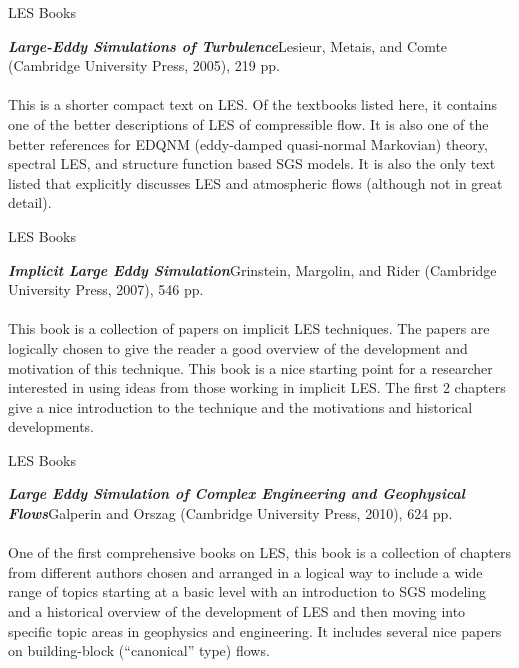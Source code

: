 \begin{frame}{LES Books}

\emph{\textbf{Large-Eddy Simulations of Turbulence}}\newline Lesieur, Metais, and Comte (Cambridge University Press, 2005), 219 pp.
~\\~\\
This is a shorter compact text on LES. Of the textbooks listed here, it contains one of the better descriptions of LES of compressible flow. It is also one of the better references for EDQNM (eddy-damped quasi-normal Markovian) theory, spectral LES, and structure function based SGS models. It is also the only text listed that explicitly discusses LES and atmospheric flows (although not in great detail).
\end{frame}

\begin{frame}{LES Books}

\emph{\textbf{Implicit Large Eddy Simulation}}\newline Grinstein,  Margolin, and Rider (Cambridge University Press, 2007), 546 pp.
~\\~\\
This book is a collection of papers on implicit LES techniques. The papers are logically chosen to give the reader a good overview of the development and motivation of this technique. This book is a nice starting point for a researcher interested in using ideas from those working in implicit LES. The first 2 chapters give a nice introduction to the technique and the motivations and historical developments.
\end{frame}

\begin{frame}{LES Books}

\emph{\textbf{Large Eddy Simulation of Complex Engineering and Geophysical Flows}}\newline Galperin and Orszag (Cambridge University Press, 2010), 624 pp.
~\\~\\
One of the first comprehensive books on LES, this book is a collection of chapters from different authors chosen and arranged in a logical way to include a wide range of topics starting at a basic level with an introduction to SGS modeling and a historical overview of the development of LES and then moving into specific topic areas in geophysics and engineering. It includes several nice papers on building-block (``canonical'' type) flows.
\end{frame}


